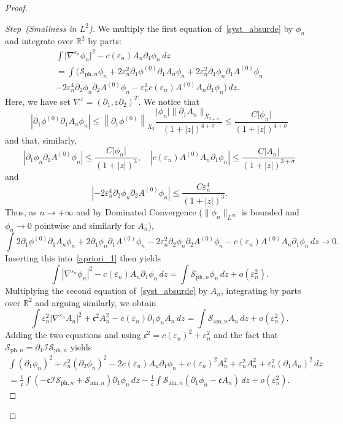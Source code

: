 \documentclass[10pt]{amsart}
\theoremstyle{definition}\newtheorem{defi}[theo]{Definition}\newtheorem{rema}[theo]{Remark}\newtheorem{exam}[theo]{Example}\newtheorem{exem}[theo]{Example}\newtheorem{nota}[theo]{Notation}
\newcommand*\p{\partial}
\newcommand*\R{\mathbb R}
\newcommand{\amm}{\mathrm{am}}
\newcommand{\phl}{\mathrm{ph}}
\newcommand*\BI{\mathcal{I}}
\newcommand*\BS{\mathcal{S}}
\newcommand*\cs{{\mathfrak c}}
\newcommand*\ii{\infty}
\newcommand*\ls{\leqslant }
\newcommand*\e{\varepsilon}
\newcommand*\s{\sigma}
\newcounter{stepcount}
\newenvironment{step}[1]{\refstepcounter{stepcount}\begin{proof}[{Step~\thestepcount}{\;(#1)}]}{\let\qed\relax\end{proof}}
\begin{document}
\begin{proof}
\begin{step}{{Smallness in $ L^2 $}}\label{step2sect4.4}
We multiply the first equation of~\eqref{syst_absurde} by $ \phi_n $ and integrate over $ \R^2 $ by parts:
\begin{multline}\label{apriori_1}
 \int \lvert \nabla^{\e_n} \phi_n \rvert^2 - c(\e_n) A_n \p_1 \phi_n \, dz\\
 = \int \Big(\BS_{{\phl},n} \phi_n + 2 \e_n^2 \p_1 \phi^{(0)} \p_1 A_n \phi_n + 2 \e_n^2 \p_1 \phi_n \p_1 A^{(0)} \phi_n
\\
- 2 \e_n^4 \p_{2} \phi_n \p_{2} A^{(0)} \phi_n - \e_n^2 c(\e_n) A^{(0)} A_n \p_1 \phi_n \Big) \, dz.
\end{multline}
Here, we have set $ \nabla^\e = (\p_1, \e \p_2)^T $. We notice that
\[
\left\lvert \p_1 \phi^{(0)} \p_1 A_n \phi_n \right\rvert
\ls \left\| \p_1 \phi^{(0)} \right\|_{X_2} \frac{ \lvert \phi_n \rvert \| \p_1 A_n \|_{X_{2+\s} }} { (1+|z|)^{4+\s} }
\ls \frac{ C \lvert \phi_n \rvert }{ (1+|z|)^{4+\s} }
\]
and that, similarly,
\[
\left\lvert \p_1 \phi_n \p_1 A^{(0)} \phi_n \right\rvert
\ls \frac{ C \lvert \phi_n \rvert }{ (1+|z|)^{3} },
\quad
\left\lvert c(\e_n) A^{(0)} A_n \p_1 \phi_n \right\rvert
\ls \frac{ C \lvert A_n \rvert }{ (1+|z|)^{3+ \s} }
\]
and
\[
\left\lvert - 2 \e_n^4 \p_{2} \phi_n \p_{2} A^{(0)} \phi_n \right\rvert \ls \frac{C \e_n^4}{ (1+ |z|)^3 }.
\]
Thus, as $ n \to +\ii $ and by Dominated Convergence ($\| \phi_n \|_{L^\ii} $ is bounded and $ \phi_n \to 0 $ pointwise and similarly for $A_n $),
\[
\int 2 \p_1 \phi^{(0)} \p_1 A_n \phi_n + 2 \p_1 \phi_n \p_1 A^{(0)} \phi_n - 2 \e_n^2 \p_{2} \phi_n \p_{2} A^{(0)} \phi_n - c(\e_n) A^{(0)} A_n \p_1 \phi_n \, dz
\to 0.
\]
Inserting this into~\eqref{apriori_1} then yields
\[
\int \left\lvert \nabla^{\e_n} \phi_n \right\rvert^2 - c(\e_n) A_n \p_1 \phi_n \, dz = \int \BS_{{\phl},n} \phi_n \, dz + o (\e_n^2).
\]
Multiplying the second equation of~\eqref{syst_absurde} by $ A_n $, integrating by parts over $ \R^2 $ and arguing similarly, we obtain
\[
\int \e_n^2 \lvert \nabla^{\e_n} A_n \rvert^2 + \cs^2 A_n^2 - c(\e_n) \p_1 \phi_n A_n \, dz = \int \BS_{{\amm},n} A_n \, dz + o (\e_n^2).
\]
Adding the two equations and using $ \cs^2 = c(\e_n)^2 + \e_n^2 $ and the fact that $ \BS_{{\phl},n} = \p_1 \BI \BS_{{\phl},n} $ yields
\begin{multline*}
 \int (\p_1 \phi_n)^2 + \e_n^2 (\p_2 \phi_n)^2 - 2 c(\e_n) A_n \p_1 \phi_n + c(\e_n)^2 A_n^2 + \e_n^2 A_n^2 + \e_n^2 (\p_1 A_n)^2
\, dz \\
 = \frac{1}{\cs} \int \left(- \cs \BI \BS_{{\phl},n} + \BS_{{\amm},n}\right) \p_1 \phi_n \, dz - \frac{1}{\cs} \int \BS_{{\amm},n} (\p_1 \phi_n - \cs A_n) \, dz + o(\e_n^2).

\end{multline*}
\end{step}
\end{proof}
\end{document}
